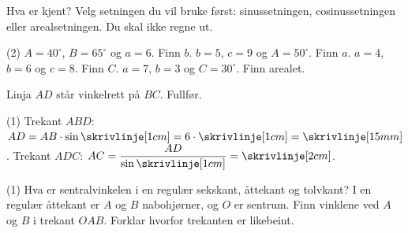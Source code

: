 
Hva er kjent? Velg setningen du vil bruke først: sinussetningen, cosinussetningen eller arealsetningen. Du skal ikke regne ut.
\begin{tasks}(2)
  \task $A = 40^\circ$, $B = 65^\circ$ og $a = 6$. Finn $b$.
  \task $b = 5$, $c = 9$ og $A = 50^\circ$. Finn $a$.
  \task $a = 4$, $b = 6$ og $c = 8$. Finn $C$.
  \task $a = 7$, $b = 3$ og $C = 30^\circ$. Finn arealet.
\end{tasks}

\begin{minipage}[t]{0.58\linewidth}
Linja $AD$ står vinkelrett på $BC$. Fullfør.
\begin{tasks}(1)
  \task Trekant $ABD$: $AD = AB \cdot \sin\skrivlinje[1cm] = 6 \cdot \skrivlinje[1cm] = \skrivlinje[15mm]$.
  \task Trekant $ADC$: $AC = \dfrac{AD}{\sin\skrivlinje[1cm]} = \skrivlinje[2cm]$.
\end{tasks}
\end{minipage}\hfill
\begin{minipage}[t]{0.38\linewidth}
\centering
{}
\end{minipage}

\begin{tasks}(1)
  \task Hva er sentralvinkelen i en regulær sekskant, åttekant og tolvkant?
  \task I en regulær åttekant er $A$ og $B$ nabohjørner, og $O$ er sentrum. Finn vinklene ved $A$ og $B$ i trekant $OAB$. Forklar hvorfor trekanten er likebeint.
\end{tasks}


